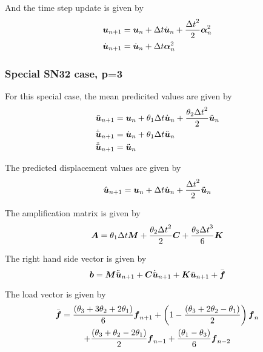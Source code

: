 And the time step update is given by
\begin{equation}
  \begin{split}
    \boldsymbol{u}_{n+1} &= \boldsymbol{u}_{n}+\Delta t\dot{\boldsymbol{u}}_{n} +\dfrac{{\Delta t}^{2}}{2}\boldsymbol{\alpha}^{2}_{n} \\
    \dot{\boldsymbol{u}}_{n+1} &= \dot{\boldsymbol{u}}_{n}+\Delta t\boldsymbol{\alpha}^{2}_{n} 
  \end{split}
\end{equation}

\subsubsection{Special SN32 case, p=3}

For this special case, the mean predicited values are given by
\begin{equation}
  \begin{split}
    \bar{\boldsymbol{u}}_{n+1} &= \boldsymbol{u}_{n}+\theta_{1}\Delta
    t\dot{\boldsymbol{u}}_{n}+\dfrac{\theta_{2}{\Delta
        t}^{2}}{2}\ddot{\boldsymbol{u}}_{n}\\
    \dot{\bar{\boldsymbol{u}}}_{n+1} &=
    \dot{\boldsymbol{u}}_{n}+\theta_{1}\Delta t\ddot{\boldsymbol{u}}_{n}\\
    \ddot{\bar{\boldsymbol{u}}}_{n+1} &= \ddot{\boldsymbol{u}}_{n}
  \end{split}
\end{equation}

The predicted displacement values are given by
\begin{equation}
   \hat{\boldsymbol{u}}_{n+1} = \boldsymbol{u}_{n}+\Delta
   t\dot{\boldsymbol{u}}_{n}+\dfrac{{\Delta t}^{2}}{2}\ddot{\boldsymbol{u}}_{n}
\end{equation}

The amplification matrix is given by
\begin{equation}
  \matr{A}=\theta_{1}{\Delta t}\matr{M}+\dfrac{\theta_{2}{\Delta t}^{2}}{2}\matr{C}+\dfrac{\theta_{3}{\Delta t}^{3}}{6}\matr{K}
\end{equation}

The right hand side vector is given by
\begin{equation}
  \vectr{b}=\matr{M}\ddot{\bar{\vectr{u}}}_{n+1}+\matr{C}\dot{\bar{\vectr{u}}}_{n+1}+\matr{K}\bar{\vectr{u}}_{n+1}+\bar{\vectr{f}}
\end{equation}

The load vector is given by
\begin{multline}
  \bar{\boldsymbol{f}}=\dfrac{\left( \theta_{3}+3\theta_{2}+2\theta_{1} \right)}{6}\boldsymbol{f}_{n+1}
  +\left( 1-\dfrac{\left( \theta_{3}+2\theta_{2}-\theta_{1} \right)}{2} \right)\boldsymbol{f}_{n} \\
  +\dfrac{\left( \theta_{3}+\theta_{2}-2\theta_{1} \right)}{2}\boldsymbol{f}_{n-1}
  +\dfrac{\left( \theta_{1}-\theta_{3} \right)}{6}\boldsymbol{f}_{n-2}
\end{multline}

